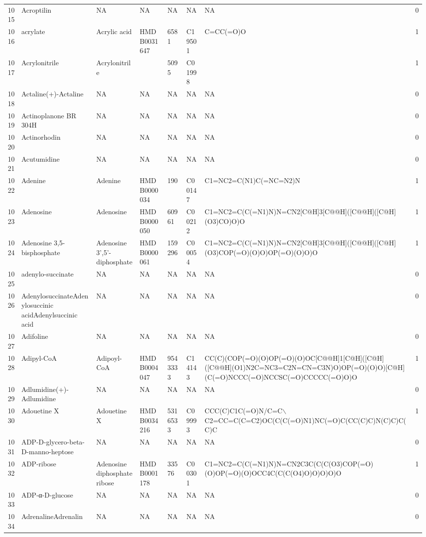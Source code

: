 \documentclass[a4paper]{article}
\begin{document}
\begin{longtable}{rlllllll}
  1015 & Acroptilin & NA & NA & NA & NA & NA & 0 \\ 
  1016 & acrylate & Acrylic acid & HMDB0031647 & 6581 & C19501 & C=CC(=O)O & 1 \\ 
  1017 & Acrylonitrile & Acrylonitrile &  & 5095 & C01998 &  & 1 \\ 
  1018 & Actaline(+)-Actaline & NA & NA & NA & NA & NA & 0 \\ 
  1019 & Actinoplanone BR 304H & NA & NA & NA & NA & NA & 0 \\ 
  1020 & Actinorhodin & NA & NA & NA & NA & NA & 0 \\ 
  1021 & Acutumidine & NA & NA & NA & NA & NA & 0 \\ 
  1022 & Adenine & Adenine & HMDB0000034 & 190 & C00147 & C1=NC2=C(N1)C(=NC=N2)N & 1 \\ 
  1023 & Adenosine & Adenosine & HMDB0000050 & 60961 & C00212 & C1=NC2=C(C(=N1)N)N=CN2[C@H]3[C@@H]([C@@H]([C@H](O3)CO)O)O & 1 \\ 
  1024 & Adenosine 3,5-bisphosphate & Adenosine 3',5'-diphosphate & HMDB0000061 & 159296 & C00054 & C1=NC2=C(C(=N1)N)N=CN2[C@H]3[C@@H]([C@@H]([C@H](O3)COP(=O)(O)O)OP(=O)(O)O)O & 1 \\ 
  1025 & adenylo-succinate & NA & NA & NA & NA & NA & 0 \\ 
  1026 & AdenylosuccinateAdenylosuccinic acidAdenylsuccinic acid & NA & NA & NA & NA & NA & 0 \\ 
  1027 & Adifoline & NA & NA & NA & NA & NA & 0 \\ 
  1028 & Adipyl-CoA & Adipoyl-CoA & HMDB0004047 & 9543333 & C14143 & CC(C)(COP(=O)(O)OP(=O)(O)OC[C@@H]1[C@H]([C@H]([C@@H](O1)N2C=NC3=C2N=CN=C3N)O)OP(=O)(O)O)[C@H](C(=O)NCCC(=O)NCCSC(=O)CCCCC(=O)O)O & 1 \\ 
  1029 & Adlumidine(+)-Adlumidine & NA & NA & NA & NA & NA & 0 \\ 
  1030 & Adouetine X & Adouetine X & HMDB0034216 & 5316533 & C09993 & CCC(C)C1C(=O)N/C=C$\backslash$C2=CC=C(C=C2)OC(C(C(=O)N1)NC(=O)C(CC(C)C)N(C)C)C(C)C & 1 \\ 
  1031 & ADP-D-glycero-beta-D-manno-heptose & NA & NA & NA & NA & NA & 0 \\ 
  1032 & ADP-ribose & Adenosine diphosphate ribose & HMDB0001178 & 33576 & C00301 & C1=NC2=C(C(=N1)N)N=CN2C3C(C(C(O3)COP(=O)(O)OP(=O)(O)OCC4C(C(C(O4)O)O)O)O)O & 1 \\ 
  1033 & ADP-α-D-glucose & NA & NA & NA & NA & NA & 0 \\ 
  1034 & AdrenalineAdrenalin & NA & NA & NA & NA & NA & 0 \\ 

\end{longtable}
\end{document}
